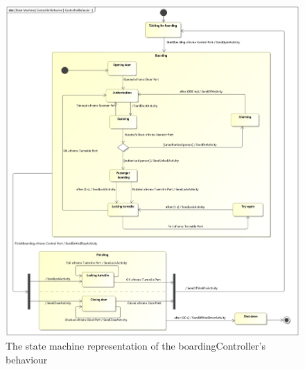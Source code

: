 \documentclass[a4paper]{article}
\begin{document}
\begin{figure}[hb]
	\includegraphics[width=\textwidth]{stm-ControllerBehavior.jpg}
	\caption{The state machine representation of the
		\gls{boardingController}'s behaviour}%
	\label{fig:stm-ControllerBehavior}
\end{figure}
\end{document}
